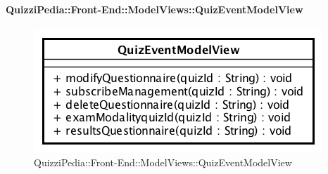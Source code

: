 \paragraph{QuizziPedia::Front-End::ModelViews::QuizEventModelView}
							
\label{QuizziPedia::Front-End::ModelViews::QuizEventModelView}

\begin{figure}[ht]
	\centering
	\includegraphics[scale=0.5,keepaspectratio]{UML/Classi/Front-End/QuizziPedia_Front-end_ModelView_QuizEventModelView.png}
	\caption{QuizziPedia::Front-End::ModelViews::QuizEventModelView}
\end{figure} \FloatBarrier

